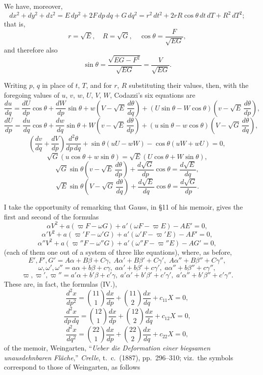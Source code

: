 \documentclass[11pt]{article}
\begin{document}
We have, moreover,
\[
dx^2 + dy^2 + dz^2 = E\,dp^2 + 2F\,dp\,dq + G\,dq^2 = r^2\,dt^2 + 2rR\cos\theta\,dt\,dT + R^2\,dT^2;
\]
that is,
\[
r = \sqrt{E},\quad R = \sqrt{G},\quad \cos\theta = \frac{F}{\sqrt{EG}},
\]
and therefore also
\[
\sin\theta = \frac{\sqrt{EG-F^2}}{\sqrt{EG}} = \frac{V}{\sqrt{EG}}.
\]

Writing $p$, $q$ in place of $t$, $T$, and for $r$, $R$ substituting their values, then, with the foregoing values of $u$, $v$, $w$, $U$, $V$, $W$, Codazzi's six equations are
\[
\frac{du}{dq} = \frac{dU}{dp}\cos\theta + \frac{dW}{dp}\sin\theta + w\!\left(V - \sqrt{E}\,\frac{d\theta}{dq}\right) + (U\sin\theta - W\cos\theta)\!\left(v - \sqrt{E}\,\frac{d\theta}{dp}\right),
\]
\[
\frac{dU}{dp} = \frac{du}{dq}\cos\theta + \frac{dw}{dq}\sin\theta + W\!\left(v - \sqrt{E}\,\frac{d\theta}{dp}\right) + (u\sin\theta - w\cos\theta)\!\left(V - \sqrt{G}\,\frac{d\theta}{dq}\right),
\]
\[
\left(\frac{dv}{dq} + \frac{dV}{dp}\right)\frac{d^2\theta}{dp\,dq} + \sin\theta(uU - wW) - \cos\theta(uW + wU) = 0,
\]
\[
\sqrt{G}(u\cos\theta + w\sin\theta) = \sqrt{E}(U\cos\theta + W\sin\theta),
\]
\[
\sqrt{G}\sin\theta\!\left(v - \sqrt{E}\,\frac{d\theta}{dp}\right) + \frac{d\sqrt{G}}{dp}\cos\theta = \frac{d\sqrt{E}}{dq},
\]
\[
\sqrt{E}\sin\theta\!\left(V - \sqrt{G}\,\frac{d\theta}{dq}\right) + \frac{d\sqrt{E}}{dq}\cos\theta = \frac{d\sqrt{G}}{dp}.
\]

I take the opportunity of remarking that Gauss, in \S 11 of his memoir, gives the first and second of the formulas
\[
\alpha V^2 + a(\varpi F - \omega G) + a'(\omega F - \varpi E) - AE' = 0,
\]
\[
\alpha' V^2 + a(\varpi' F - \omega' G) + a'(\omega' F - \varpi' E) - AF' = 0,
\]
\[
\alpha'' V^2 + a(\varpi'' F - \omega'' G) + a'(\omega'' F - \varpi'' E) - AG' = 0,
\]
(each of them one out of a system of three like equations), where, as before,
\[
E', F', G' = A\alpha+B\beta+C\gamma,\; A\alpha'+B\beta'+C\gamma',\; A\alpha''+B\beta''+C\gamma'',
\]
\[
\omega,\omega',\omega'' = a\alpha+b\beta+c\gamma,\; a\alpha'+b\beta'+c\gamma',\; a\alpha''+b\beta''+c\gamma'',
\]
\[
\varpi,\varpi',\varpi'' = a'\alpha+b'\beta+c'\gamma,\; a'\alpha'+b'\beta'+c'\gamma',\; a'\alpha''+b'\beta''+c'\gamma''.
\]
These are, in fact, the formulas (IV.),
\[
\frac{d^2 x}{dp^2} = \binom{11}{1}\frac{dx}{dp} + \binom{11}{2}\frac{dx}{dq} + c_{11}X = 0,
\]
\[
\frac{d^2 x}{dp\,dq} = \binom{12}{1}\frac{dx}{dp} + \binom{12}{2}\frac{dx}{dq} + c_{12}X = 0,
\]
\[
\frac{d^2 x}{dq^2} = \binom{22}{1}\frac{dx}{dp} + \binom{22}{2}\frac{dx}{dq} + c_{22}X = 0,
\]
of the memoir, Weingarten, ``\textit{Ueber die Deformation einer biegsamen unausdehnbaren Fl\"ache},'' \textit{Crelle}, t.\ c.\ (1887), pp.\ 296--310; viz.\ the symbols correspond to those of Weingarten, as follows
\end{document}
